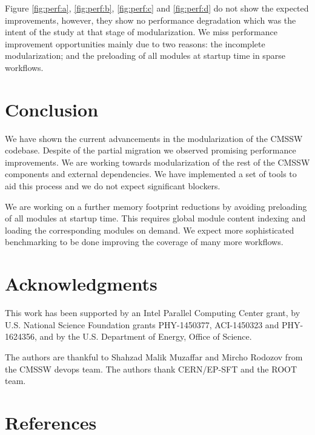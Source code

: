 \documentclass[12pt]{iopart}
\begin{document}
Figure \ref{fig:perf:a}, \ref{fig:perf:b}, \ref{fig:perf:c} and \ref{fig:perf:d} do not show the expected improvements, however, they show no performance degradation which was the intent of the study at that stage of modularization. We miss performance improvement opportunities mainly due to two reasons: the incomplete modularization; and the preloading of all modules at startup time in sparse workflows.
 
 

\section{Conclusion}
We have shown the current advancements in the modularization of the CMSSW codebase. Despite of the partial migration we observed promising performance improvements. We are working towards modularization of the rest of the CMSSW components and external dependencies. We have implemented a set of tools to aid this process and we do not expect significant blockers.

We are working on a further memory footprint reductions by avoiding preloading of all modules at startup time. This requires global module content indexing and loading the corresponding modules on demand. We expect more sophisticated benchmarking to be done improving the coverage of many more workflows.


\section{Acknowledgments}
\label{ack}

This work has been supported by an Intel Parallel Computing Center grant, by U.S. National Science Foundation grants PHY-1450377, ACI-1450323 and PHY-1624356, and by the U.S. Department of Energy, Office of Science.

The authors are thankful to Shahzad Malik Muzaffar and Mircho Rodozov from the CMSSW devops team. The authors thank CERN/EP-SFT and the ROOT team.


\section*{References}
\end{document}
